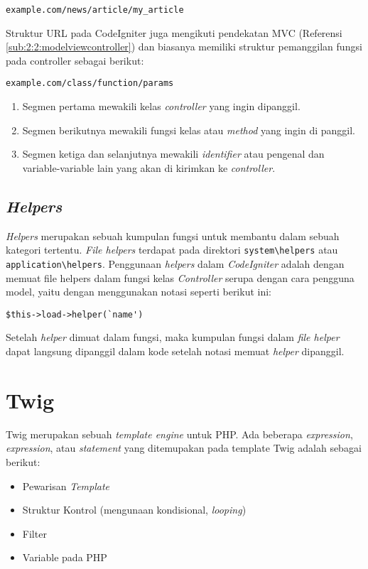 \begin{center}
	\verb|example.com/news/article/my_article|
\end{center}

Struktur URL pada CodeIgniter juga mengikuti pendekatan MVC (Referensi \ref{sub:2:2:modelviewcontroller}) dan biasanya memiliki struktur pemanggilan fungsi pada controller sebagai berikut:

\begin{center}
	\verb|example.com/class/function/params|
\end{center}

\begin{enumerate}
	\item Segmen pertama mewakili kelas \textit{controller} yang ingin dipanggil.
	\item Segmen berikutnya mewakili fungsi kelas atau \textit{method} yang ingin di panggil.
	\item Segmen ketiga dan selanjutnya mewakili \textit{identifier} atau pengenal dan variable-variable lain yang akan di kirimkan ke \textit{controller}.
\end{enumerate}

\subsection{\textit{Helpers}}
\label{sub:2:2:helpers}

\textit{Helpers} merupakan sebuah kumpulan fungsi untuk membantu dalam sebuah kategori tertentu. \textit{File helpers} terdapat pada direktori \verb|system\helpers| atau \verb|application\helpers|. Penggunaan \textit{helpers} dalam \textit{CodeIgniter} adalah dengan memuat file helpers dalam fungsi kelas \textit{Controller} serupa dengan cara pengguna model, yaitu dengan menggunakan notasi seperti berikut ini:

\begin{center}
	\verb|$this->load->helper(`name')|
\end{center}

Setelah \textit{helper} dimuat dalam fungsi, maka kumpulan fungsi dalam \textit{file helper} dapat langsung dipanggil dalam kode setelah notasi memuat \textit{helper} dipanggil.

\section{Twig}
\label{sec:2:twig}

Twig merupakan sebuah \textit{template engine} untuk PHP. Ada beberapa \textit{expression}, \textit{expression}, atau \textit{statement} yang ditemupakan pada template Twig adalah sebagai berikut:
\begin{itemize}
	\item Pewarisan \textit{Template}
	\item Struktur Kontrol (mengunaan kondisional, \textit{looping})
	\item Filter
	\item Variable pada PHP
\end{itemize}

